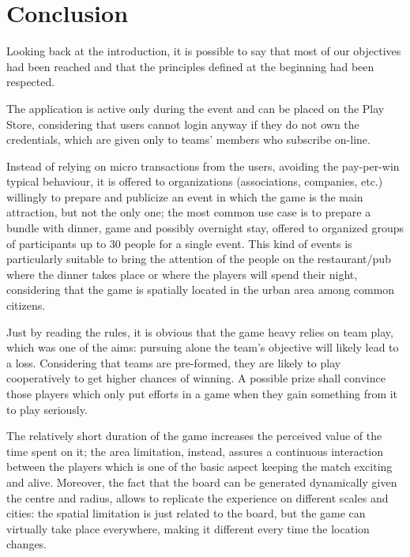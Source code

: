 \chapter{Conclusion}

	Looking back at the introduction, it is possible to say that most of our objectives had been reached and that the principles defined at the beginning had been respected.
	
	The application is active only during the event and can be placed on the Play Store, considering that users cannot login anyway if they do not own the credentials, which are given only to teams' members who subscribe on-line.
	
	Instead of relying on micro transactions from the users, avoiding the pay-per-win typical behaviour, it is offered to organizations (associations, companies, etc.) willingly to prepare and publicize an event in which the game is the main attraction, but not the only one; the most common use case is to prepare a bundle with dinner, game and possibly overnight stay, offered to organized groups of participants up to 30 people for a single event.
	This kind of events is particularly suitable to bring the attention of the people on the restaurant/pub where the dinner takes place or where the players will spend their night, considering that the game is spatially located in the urban area among common citizens.
	
	Just by reading the rules, it is obvious that the game heavy relies on team play, which was one of the aims: pursuing alone the team's objective will likely lead to a loss. Considering that teams are pre-formed, they are likely to play cooperatively to get higher chances of winning. A possible prize shall convince those players which only put efforts in a game when they gain something from it to play seriously.
	
	The relatively short duration of the game increases the perceived value of the time spent on it; the area limitation, instead, assures a continuous interaction between the players which is one of the basic aspect keeping the match exciting and alive. Moreover, the fact that the board can be generated dynamically given the centre and radius, allows to replicate the experience on different scales and cities: the spatial limitation is just related to the board, but the game can virtually take place everywhere, making it different every time the location changes. \\
	
